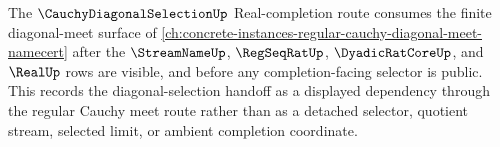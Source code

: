 The $\CauchyDiagonalSelectionUp$ Real-completion route consumes the finite diagonal-meet surface of \autoref{ch:concrete-instances-regular-cauchy-diagonal-meet-namecert} after the $\StreamNameUp$, $\RegSeqRatUp$, $\DyadicRatCoreUp$, and $\RealUp$ rows are visible, and before any completion-facing selector is public. This records the diagonal-selection handoff as a displayed dependency through the regular Cauchy meet route rather than as a detached selector, quotient stream, selected limit, or ambient completion coordinate.
